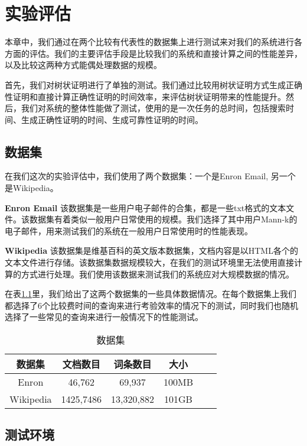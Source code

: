 \chapter{实验评估}
\label{chap:evaluation}
本章中，我们通过在两个比较有代表性的数据集上进行测试来对我们的系统进行各方面的评估。我们的主要评估手段是比较我们的系统和直接计算之间的性能差异，以及比较这两种方式能偶处理数据的规模。

首先，我们对树状证明进行了单独的测试。我们通过比较用树状证明方式生成正确性证明和直接计算正确性证明的时间效率，来评估树状证明带来的性能提升。然后，我们对系统的整体性能做了测试，使用的是一次任务的总时间，包括搜索时间、生成正确性证明的时间、生成可靠性证明的时间。

\section{数据集}

在我们这次的实验评估中，我们使用了两个数据集：一个是Enron Email, 另一个是Wikipedia。

\textbf{Enron Email} 该数据集是一些用户电子邮件的合集，都是一些txt格式的文本文件。该数据集有着类似一般用户日常使用的规模。我们选择了其中用户Mann-k的电子邮件，用来测试我们的系统在一般用户日常使用时的性能表现。

\textbf{Wikipedia} 该数据集是维基百科的英文版本数据集，文档内容是以HTML各个的文本文件进行存储。该数据集数据规模较大，在我们的测试环境里无法使用直接计算的方式进行处理。我们使用该数据来测试我们的系统应对大规模数据的情况。

在表\ref{tab:dataset_stat}里，我们给出了这两个数据集的一些具体数据情况。在每个数据集上我们都选择了6个比较费时间的查询来进行考验效率的情况下的测试，同时我们也随机选择了一些常见的查询来进行一般情况下的性能测试。
\begin{table}[!tb]
    \centering
    \caption{\textsc{数据集}}
    \begin{tabular}{cccccc}
        \toprule
        数据集 & 文档数目 & 词条数目 & 大小 \\
        \midrule
        Enron & 46,762 & 69,937 & 100MB  \\
        Wikipedia & 1425,7486 & 13,320,882 & 101GB  \\
        \bottomrule
    \end{tabular}
    \label{tab:dataset_stat}
\end{table}

\section {测试环境}


